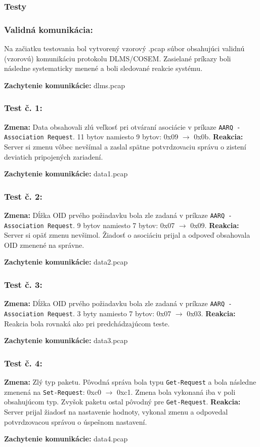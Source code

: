 \subsubsection{Testy}
\subsubsection{Validná komunikácia:} 
Na začiatku testovania bol vytvorený vzorový .pcap súbor obsahujúci validnú (vzorovú) komunikáciu protokolu DLMS/COSEM. Zasielané príkazy boli následne systematicky menené a boli sledované reakcie systému. \par
\noindent \textbf{Zachytenie komunikácie:} dlms.pcap
\subsubsection{Test č. 1:}
\textbf{Zmena:} Data obsahovali zlú veľkosť pri otváraní asociácie v príkaze {\tt AARQ - Association Request}. 11 bytov namiesto 9 bytov: 0x09 $\rightarrow$ 0x0b. \newline
\textbf{Reakcia:} Server si zmenu vôbec nevšímal a zaslal spätne potvrdzovaciu správu o zistení deviatich pripojených zariadení. \par
\noindent \textbf{Zachytenie komunikácie:} data1.pcap
\subsubsection{Test č. 2:}
\textbf{Zmena:} Dĺžka OID prvého požiadavku bola zle zadaná v príkaze {\tt AARQ - Association Request}. 9 bytov namiesto 7 bytov: 0x07 $\rightarrow$ 0x09. \newline
\textbf{Reakcia:} Server si opäť zmenu nevšimol. Žiadosť o asociáciu prijal a odpoveď obsahovala OID zmenené na správne. \par
\noindent \textbf{Zachytenie komunikácie:} data2.pcap
\subsubsection{Test č. 3:}
\textbf{Zmena:} Dĺžka OID prvého požiadavku bola zle zadaná v príkaze {\tt AARQ - Association Request}. 3 byty namiesto 7 bytov: 0x07 $\rightarrow$ 0x03. \newline
\textbf{Reakcia:} Reakcia bola rovnaká ako pri predchádzajúcom teste. \par
\noindent \textbf{Zachytenie komunikácie:} data3.pcap
\subsubsection{Test č. 4:}
\textbf{Zmena:} Zlý typ paketu. Pôvodná správa bola typu {\tt Get-Request} a bola následne zmenená na {\tt Set\--Request}: 0xc0 $\rightarrow$ 0xc1. Zmena bola vykonaná iba v poli obsahujúcom typ. Zvyšok paketu ostal pôvodný pre {\tt Get-Request}. \newline
\textbf{Reakcia:} Server prijal žiadosť na nastavenie hodnoty, vykonal zmenu a odpovedal potvrdzovacou správou o úspešnom nastavení. \par
\noindent \textbf{Zachytenie komunikácie:} data4.pcap
